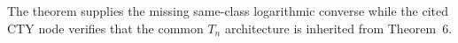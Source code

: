 The theorem supplies the missing same-class logarithmic converse while the cited CTY node verifies that the common \(T_n\) architecture is inherited from Theorem~6.